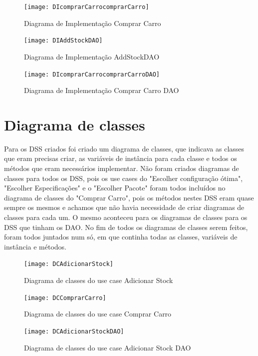 \documentclass[10pt, a4paper]{report}
\begin{document}
\begin{figure}[!htb]
\centering
\texttt{[image: DIcomprarCarrocomprarCarro]}
\caption{Diagrama de Implementação Comprar Carro}
\label{DICC}
\end{figure}

\begin{figure}[!htb]
\centering
\texttt{[image: DIAddStockDAO]}
\caption{Diagrama de Implementação AddStockDAO}
\label{DIASDAO}
\end{figure}

\begin{figure}[!htb]
\centering
\texttt{[image: DIcomprarCarrocomprarCarroDAO]}
\caption{Diagrama de Implementação Comprar Carro DAO}
\label{DICCDAO}
\end{figure}


\newpage
\section{Diagrama de classes}
Para os DSS criados foi criado um diagrama de classes, que indicava as classes que eram precisas criar, as variáveis de instância para cada classe e todos os métodos que eram necessários implementar. Não foram criados diagramas de classes para todos os DSS, pois os use cases do "Escolher configuração ótima", "Escolher Especificações" e o "Escolher Pacote" foram todos incluídos no diagrama de classes do "Comprar Carro", pois os métodos nestes DSS eram quase sempre os mesmos e achamos que não havia necessidade de criar diagramas de classes para cada um. O mesmo aconteceu para os diagramas de classes para os DSS que tinham os DAO.
No fim de todos os diagramas de classes serem feitos, foram todos juntados num só, em que continha todas as classes, variáveis de instância e métodos.

\begin{figure}[!htb]
\centering
\texttt{[image: DCAdicionarStock]}
\caption{Diagrama de classes do use case Adicionar Stock}
\label{DCAS}
\end{figure}

\begin{figure}[!htb]
\centering
\texttt{[image: DCComprarCarro]}
\caption{Diagrama de classes do use case Comprar Carro}
\label{DCCP}
\end{figure}

\begin{figure}[!htb]
\centering
\texttt{[image: DCAdicionarStockDAO]}
\caption{Diagrama de classes do use case Adicionar Stock DAO}
\label{DCASDAO}
\end{figure}
\end{document}
